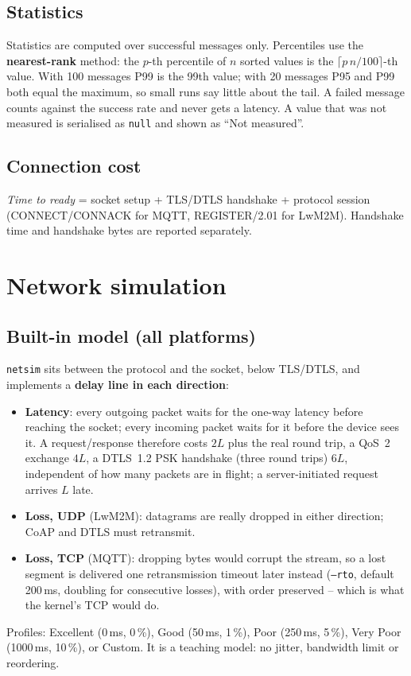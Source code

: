 \documentclass[11pt,a4paper]{article}
\newcommand{\code}[1]{\texttt{#1}}
\begin{document}
\subsection{Statistics}
Statistics are computed over successful messages only. Percentiles use the
\textbf{nearest-rank} method: the $p$-th percentile of $n$ sorted values is the
$\lceil p\,n/100\rceil$-th value. With 100 messages P99 is the 99th value; with
20 messages P95 and P99 both equal the maximum, so small runs say little about
the tail. A failed message counts against the success rate and never gets a
latency. A value that was not measured is serialised as \code{null} and shown
as ``Not measured''.

\subsection{Connection cost}
\emph{Time to ready} = socket setup + TLS/DTLS handshake + protocol session
(CONNECT/CONNACK for MQTT, REGISTER/2.01 for LwM2M). Handshake time and
handshake bytes are reported separately.

\section{Network simulation}

\subsection{Built-in model (all platforms)}
\code{netsim} sits between the protocol and the socket, below TLS/DTLS, and
implements a \textbf{delay line in each direction}:
\begin{itemize}
  \item \textbf{Latency}: every outgoing packet waits for the one-way latency
        before reaching the socket; every incoming packet waits for it before
        the device sees it. A request/response therefore costs
        $2L$ plus the real round trip, a QoS~2 exchange $4L$, a DTLS~1.2 PSK
        handshake (three round trips) $6L$, independent of how many packets
        are in flight; a server-initiated request arrives $L$ late.
  \item \textbf{Loss, UDP} (LwM2M): datagrams are really dropped in either
        direction; CoAP and DTLS must retransmit.
  \item \textbf{Loss, TCP} (MQTT): dropping bytes would corrupt the stream, so
        a lost segment is delivered one retransmission timeout later instead
        (\code{--rto}, default 200\,ms, doubling for consecutive losses), with
        order preserved -- which is what the kernel's TCP would do.
\end{itemize}
Profiles: Excellent (0\,ms, 0\,\%), Good (50\,ms, 1\,\%), Poor (250\,ms, 5\,\%),
Very Poor (1000\,ms, 10\,\%), or Custom. It is a teaching model: no jitter,
bandwidth limit or reordering.
\end{document}
